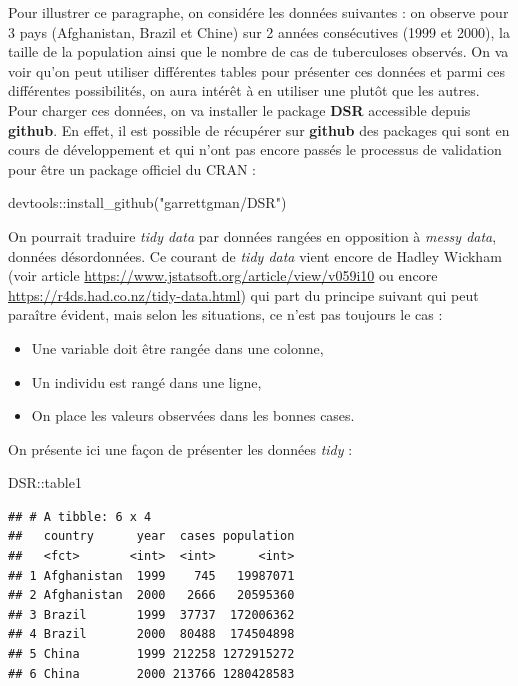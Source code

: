 \documentclass[
]{book}
\newenvironment{Shaded}{\begin{snugshade}}{\end{snugshade}}
\newcommand{\FunctionTok}[1]{\textcolor[rgb]{0.00,0.00,0.00}{#1}}
\newcommand{\NormalTok}[1]{#1}
\newcommand{\SpecialCharTok}[1]{\textcolor[rgb]{0.00,0.00,0.00}{#1}}
\newcommand{\StringTok}[1]{\textcolor[rgb]{0.31,0.60,0.02}{#1}}
\theoremstyle{definition}
\theoremstyle{definition}
\theoremstyle{definition}
\theoremstyle{definition}
\theoremstyle{remark}
\begin{document}
Pour illustrer ce paragraphe, on considére les données suivantes : on observe pour 3 pays (Afghanistan, Brazil et Chine) sur 2 années consécutives (1999 et 2000), la taille de la population ainsi que le nombre de cas de tuberculoses observés. On va voir qu'on peut utiliser différentes tables pour présenter ces données et parmi ces différentes possibilités, on aura intérêt à en utiliser une plutôt que les autres. Pour charger ces données, on va installer le package \textbf{DSR} accessible depuis \textbf{github}. En effet, il est possible de récupérer sur \textbf{github} des packages qui sont en cours de développement et qui n'ont pas encore passés le processus de validation pour être un package officiel du CRAN :

\begin{Shaded}
\begin{Highlighting}[]
\NormalTok{devtools}\SpecialCharTok{::}\FunctionTok{install\_github}\NormalTok{(}\StringTok{"garrettgman/DSR"}\NormalTok{)}
\end{Highlighting}
\end{Shaded}

On pourrait traduire \emph{tidy data} par données rangées en opposition à \emph{messy data}, données désordonnées. Ce courant de \emph{tidy data} vient encore de Hadley Wickham (voir article \url{https://www.jstatsoft.org/article/view/v059i10} ou encore \url{https://r4ds.had.co.nz/tidy-data.html}) qui part du principe suivant qui peut paraître évident, mais selon les situations, ce n'est pas toujours le cas :

\begin{itemize}
\item
  Une variable doit être rangée dans une colonne,
\item
  Un individu est rangé dans une ligne,
\item
  On place les valeurs observées dans les bonnes cases.
\end{itemize}

On présente ici une façon de présenter les données \emph{tidy} :

\begin{Shaded}
\begin{Highlighting}[]
\NormalTok{DSR}\SpecialCharTok{::}\NormalTok{table1}
\end{Highlighting}
\end{Shaded}

\begin{verbatim}
## # A tibble: 6 x 4
##   country      year  cases population
##   <fct>       <int>  <int>      <int>
## 1 Afghanistan  1999    745   19987071
## 2 Afghanistan  2000   2666   20595360
## 3 Brazil       1999  37737  172006362
## 4 Brazil       2000  80488  174504898
## 5 China        1999 212258 1272915272
## 6 China        2000 213766 1280428583
\end{verbatim}
\end{document}
